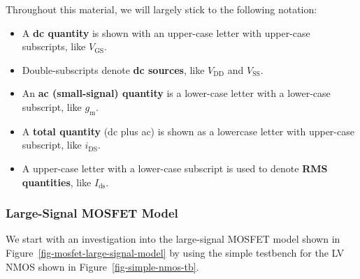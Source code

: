 \documentclass[
  a4paper,
  DIV=11,
  numbers=noendperiod]{scrartcl}
\providecommand{\tightlist}{%
  \setlength{\itemsep}{0pt}\setlength{\parskip}{0pt}}\usepackage{longtable,booktabs,array}
\begin{document}
\begin{tcolorbox}[enhanced jigsaw, breakable, title=\textcolor{quarto-callout-important-color}{\faExclamation}\hspace{0.5em}{Mathematical Notation}, left=2mm, bottomrule=.15mm, opacitybacktitle=0.6, opacityback=0, colframe=quarto-callout-important-color-frame, leftrule=.75mm, bottomtitle=1mm, colbacktitle=quarto-callout-important-color!10!white, toprule=.15mm, rightrule=.15mm, toptitle=1mm, titlerule=0mm, arc=.35mm, colback=white, coltitle=black]

Throughout this material, we will largely stick to the following
notation:

\begin{itemize}
\tightlist
\item
  A \textbf{dc quantity} is shown with an upper-case letter with
  upper-case subscripts, like \(V_\mathrm{GS}\).
\item
  Double-subscripts denote \textbf{dc sources}, like \(V_\mathrm{DD}\)
  and \(V_\mathrm{SS}\).
\item
  An \textbf{ac (small-signal) quantity} is a lower-case letter with a
  lower-case subscript, like \(g_\mathrm{m}\).
\item
  A \textbf{total quantity} (dc plus ac) is shown as a lowercase letter
  with upper-case subscript, like \(i_\mathrm{DS}\).
\item
  A upper-case letter with a lower-case subscript is used to denote
  \textbf{RMS quantities}, like \(I_\mathrm{ds}\).
\end{itemize}

\end{tcolorbox}

\subsubsection{Large-Signal MOSFET
Model}\label{large-signal-mosfet-model}

We start with an investigation into the large-signal MOSFET model shown
in Figure~\ref{fig-mosfet-large-signal-model} by using the simple
testbench for the LV NMOS shown in Figure~\ref{fig-simple-nmos-tb}.
\end{document}
